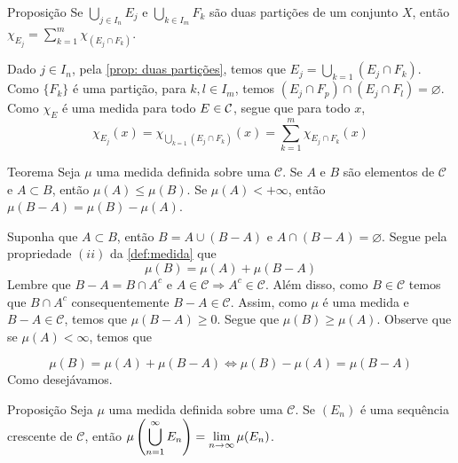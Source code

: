 \begin{env}{Proposição}
	\label{prop: igualdade da caracteristica como medida}
	Se $\displaystyle \bigcup_{j \in I_n} E_j$ e $\displaystyle\bigcup_{k \in I_m} F_k$ são duas partições de um conjunto $X$, então 
	$\displaystyle \chi_{E_j} = \sum_{k = 1}^{m} \chi_{(E_j\cap F_k)}$.
\end{env}

\begin{prova}
	Dado $j \in I_n$, pela \ref{prop: duas partições}, temos que
	$E_j = \displaystyle \bigcup_{k = 1} (E_j\cap F_k)$.
	Como $\{F_k\}$ é uma partição, para $k,l \in I_m$, temos
	$(E_j\cap F_p) \cap (E_j\cap F_l) = \varnothing$.
	Como $\chi_E$ é uma medida para todo $E \in \operatorname{\mathcal{C}}$, segue que
	para todo $x$,
	$$
	\chi_{E_j}(x)
	=
	\chi_{\bigcup_{k = 1} (E_j\cap F_k)}(x)
	=
	\sum_{k = 1}^{m}\chi_{E_j\cap F_k}(x)
	$$
\end{prova}
\begin{env}{Teorema}
\label{teo:medida-diferença}
	Seja $\mu$ uma medida definida sobre uma \sigal $\mathcal{C}$.
	Se $A$ e $B$ são elementos de $\mathcal{C}$ e $A \subset B$, então $\mu(A) \leq \mu(B)$.
	Se $\mu(A) < +\infty$, então $\mu(B-A) = \mu(B) - \mu(A)$.
\end{env}

\begin{prova}
	Suponha que $A \subset B$, então $B = A \cup (B - A)$ e $A \cap (B - A) = \varnothing$. Segue pela propriedade $(ii)$ da \ref{def:medida} que 
	$$\mu(B) = \mu(A) + \mu(B-A)$$
	Lembre que $B-A = B\cap A^c$ e $A \in \mathcal{C} \Rightarrow A^c \in \mathcal{C}$.
	Além disso, como $B \in \mathcal{C}$ temos que $ B\cap A^c$ consequentemente $B - A \in \mathcal{C}$.
	Assim, como $\mu$ é uma medida e $B-A \in \mathcal{C}$, temos que $\mu(B-A) \geq 0$.
	Segue que $\mu(B) \geq \mu(A)$.
	Observe que se $\mu(A) < \infty$, temos que 

	$$\mu(B) = \mu(A) + \mu(B-A) 
 \Leftrightarrow \mu(B) - \mu(A) =  \mu(B-A)
 $$
Como desejávamos.
\end{prova}

\begin{env}{Proposição}
\label{prop:limite-sequencia-crescente}
Seja $\mu$ uma medida definida sobre uma \sigal $\mathcal{C}$.
Se $(E_n)$ é uma sequência crescente de $\mathcal{C}$, então $\mu\left(\displaystyle \bigcup_{n = 1}^\infty E_n\right) = \displaystyle \lim_{n \to \infty} \mu(E_n)$.
\end{env} 

